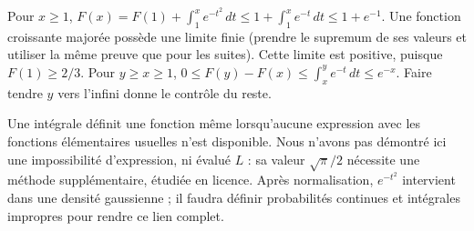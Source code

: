 Pour $x\ge1$, $F(x)=F(1)+\int_1^xe^{-t^2}\,dt\le1+\int_1^xe^{-t}\,dt\le1+e^{-1}$. Une fonction croissante majorée possède une limite finie (prendre le supremum de ses valeurs et utiliser la même preuve que pour les suites). Cette limite est positive, puisque $F(1)\ge2/3$.
Pour $y\ge x\ge1$, $0\le F(y)-F(x)\le\int_x^ye^{-t}\,dt\le e^{-x}$. Faire tendre $y$ vers l'infini donne le contrôle du reste.

Une intégrale définit une fonction même lorsqu'aucune expression avec les fonctions élémentaires usuelles n'est disponible. Nous n'avons pas démontré ici une impossibilité d'expression, ni évalué $L$ : sa valeur $\sqrt\pi/2$ nécessite une méthode supplémentaire, étudiée en licence. Après normalisation, $e^{-t^2}$ intervient dans une densité gaussienne ; il faudra définir probabilités continues et intégrales impropres pour rendre ce lien complet.
